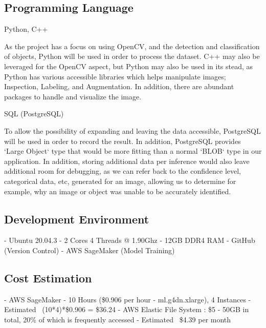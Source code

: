 \documentclass[conference]{IEEEtran}
\begin{document}
\subsection{Programming Language}
\begin{center}
Python, C++
\end{center}
As the project has a focus on using OpenCV, and the detection and classification of objects, Python will be used in order to process the dataset. C++ may also be leveraged for the OpenCV aspect, but Python may also be used in its stead, as Python has various accessible libraries which helps manipulate images; Inspection, Labeling, and Augmentation. In addition, there are abundant packages to handle and visualize the image.

\begin{center}
SQL (PostgreSQL)
\end{center}
To allow the possibility of expanding and leaving the data accessible, PostgreSQL will be used in order to record the result. In addition, PostgreSQL provides `Large Object` type that would be more fitting than a normal `BLOB` type in our application.
\newline
In addition, storing additional data per inference would also leave additional room for debugging, as we can refer back to the confidence level, categorical data, etc, generated for an image, allowing us to determine for example, why an image or object was unable to be accurately identified.

\subsection{Development Environment}
\noindent
- Ubuntu 20.04.3
\newline
- 2 Cores 4 Threads @ 1.90Ghz
\newline
- 12GB DDR4 RAM
\newline
- GitHub (Version Control)
\newline
- AWS SageMaker (Model Training)
  
\subsection{Cost Estimation}
\noindent
- AWS SageMaker
\newline
- 10 Hours (\$0.906 per hour - ml.g4dn.xlarge), 4 Instances
\newline
- Estimated ~(10*4)*\$0.906 = \$36.24
\newline
\newline
- AWS Elastic File System : \$5
\newline
- 50GB in total, 20\% of which is frequently accessed
\newline
- Estimated ~\$4.39 per month
  
\end{document}
